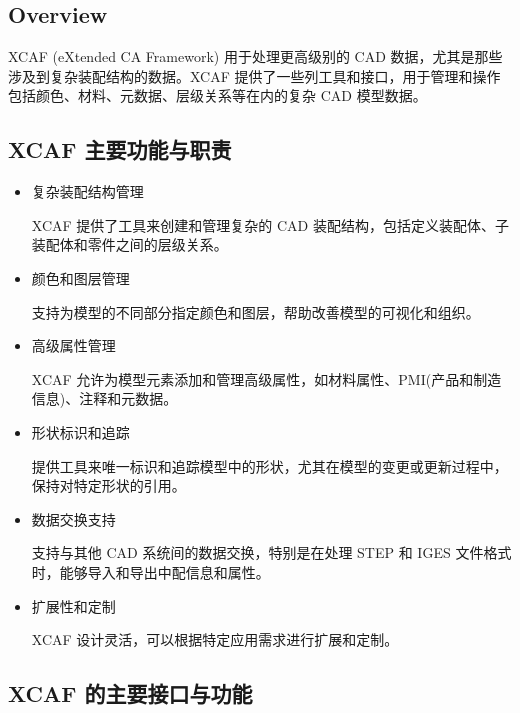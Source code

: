 \documentclass[11pt]{article}
\begin{document}
\subsection{Overview}
\label{sec:org9aa8365}

XCAF (eXtended CA Framework) 用于处理更高级别的 CAD 数据，尤其是那些涉及到复杂装配结构的数据。XCAF 提供了一些列工具和接口，用于管理和操作包括颜色、材料、元数据、层级关系等在内的复杂 CAD 模型数据。
\subsection{XCAF 主要功能与职责}
\label{sec:orga8f164d}

\begin{itemize}
\item 复杂装配结构管理

XCAF 提供了工具来创建和管理复杂的 CAD 装配结构，包括定义装配体、子装配体和零件之间的层级关系。

\item 颜色和图层管理

支持为模型的不同部分指定颜色和图层，帮助改善模型的可视化和组织。

\item 高级属性管理

XCAF 允许为模型元素添加和管理高级属性，如材料属性、PMI(产品和制造信息)、注释和元数据。

\item 形状标识和追踪

提供工具来唯一标识和追踪模型中的形状，尤其在模型的变更或更新过程中，保持对特定形状的引用。

\item 数据交换支持

支持与其他 CAD 系统间的数据交换，特别是在处理 STEP 和 IGES 文件格式时，能够导入和导出中配信息和属性。

\item 扩展性和定制

XCAF 设计灵活，可以根据特定应用需求进行扩展和定制。
\end{itemize}
\subsection{XCAF 的主要接口与功能}
\label{sec:org0ee9822}
\end{document}
